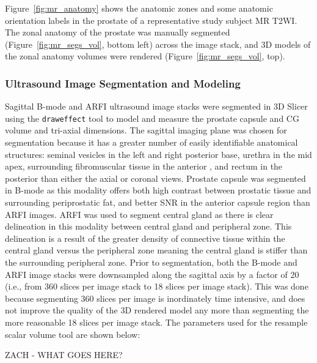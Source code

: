 Figure~\ref{fig:mr_anatomy} shows the anatomic zones and some anatomic
orientation labels in the prostate of a representative study subject MR T2WI.
The zonal anatomy of the prostate was manually segmented
(Figure~\ref{fig:mr_segs_vol}, bottom left) across the image stack, and 3D
models of the zonal anatomy volumes were rendered
(Figure~\ref{fig:mr_segs_vol}, top).





\subsubsection{Ultrasound Image Segmentation and Modeling}
Sagittal B-mode and ARFI ultrasound image stacks were segmented in 3D Slicer
using the \verb+draweffect+ tool to model and measure the prostate capsule and CG
volume and tri-axial dimensions.  The sagittal imaging plane was chosen for
segmentation because it has a greater number of easily identifiable anatomical
structures:  seminal vesicles in the left and right posterior base, urethra in
the mid apex, surrounding fibromuscular tissue in the anterior , and rectum in
the posterior  than either the axial or coronal views. Prostate capsule was
segmented in B-mode as this modality offers both high contrast between
prostatic tissue and surrounding periprostatic fat, and better SNR in the
anterior capsule region than ARFI images. ARFI was used to segment central gland as
there is clear delineation in this modality between central gland and
peripheral zone. This delineation is a result of the greater density of
connective tissue within the central gland versus the peripheral zone meaning
the central gland is stiffer than the surrounding peripheral zone.  Prior to
segmentation, both the B-mode and ARFI image stacks were downsampled along the
sagittal axis by a factor of 20 (i.e., from 360 slices per image stack to 18
slices per image stack). This was done because segmenting 360 slices per image
is inordinately time intensive, and does not improve the quality of the 3D
rendered model any more than segmenting the more reasonable 18 slices per image
stack. The parameters used for the resample scalar volume tool are shown below:

ZACH - WHAT GOES HERE?

